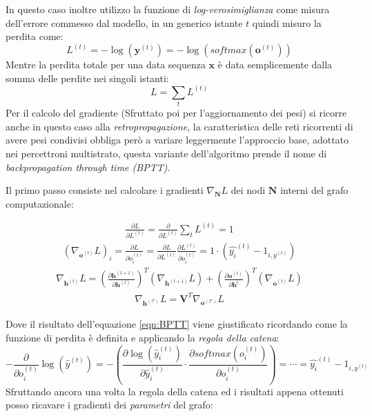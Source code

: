 \documentclass[../../main.tex]{subfiles}
\begin{document}
In questo caso inoltre utilizzo la funzione di \textit{log-verosimiglianza} come misura dell'errore commesso dal modello, in un generico istante $t$ quindi misuro la perdita come:
\[L^{(t)} = -\log(\boldsymbol{y}^{(t)}) = -\log(softmax(\boldsymbol{o}^{(t)}))\]
Mentre la perdita totale per una data sequenza $\boldsymbol{x}$ è data semplicemente dalla somma delle perdite nei singoli istanti:
\[L = \sum_t L^{(t)}\]
Per il calcolo del gradiente (Sfruttato poi per l'aggiornamento dei pesi) si ricorre anche in questo caso alla \textit{retropropagazione}, la caratteristica delle reti ricorrenti di avere pesi condivisi obbliga però a variare leggermente l'approccio base, adottato nei percettroni multistrato, questa variante dell'algoritmo prende il nome di \textit{backpropagation through time (BPTT)}.
 
Il primo passo consiste nel calcolare i gradienti $\nabla_{\boldsymbol{N}}L$ dei nodi $\boldsymbol{N}$ interni del grafo computazionale:
\begin{fleqn}[1cm]
    \begin{align}
        \frac{\partial L}{\partial L ^ {(t)}} = \frac{\partial}{\partial L ^{(t)}} \sum_t L^{(t)} = 1
    \end{align}
    \begin{align}
        (\nabla_{\boldsymbol{o}^{(t)}}L)_i = \frac{\partial L}{\partial o^{(t)}_i} = \frac{\partial L}{\partial L^{(t)}} \frac{\partial L^{(t)}}{\partial o^{(t)}_i} = 1 \cdot (\hat{y_i}^{(t)} - 1_{i,y^{(t)}})
        \label{eqn:BPTT}
    \end{align}
    \begin{align}
        \nabla_{\boldsymbol{h}^{(t)}}L = \left(\frac{\partial \boldsymbol{h}^{(t+1)}}{\partial \boldsymbol{h}^{(t)}}\right)^T (\nabla_{\boldsymbol{h}^{(t+1)}}L) + \left(\frac{\partial \boldsymbol{o}^{(t)}}{\partial \boldsymbol{h}^{t}}\right)^T (\nabla_{\boldsymbol{o}^{(t)}}L)
    \end{align}
    \begin{align}
        \nabla_{\boldsymbol{h}^{(\mathcal{T})}}L = \boldsymbol{V}^T \nabla_{\boldsymbol{o}^{(\mathcal{T})}} L 
    \end{align}
\end{fleqn}
Dove il risultato dell'equazione \ref{eqn:BPTT} viene giustificato ricordando come la funzione di perdita è definita e applicando la \textit{regola della catena}:
\[- \frac{\partial}{\partial o_i^{(t)}} \log(\hat{y}^{(t)}) = - \left(\frac{\partial \log(\hat{y}_i^{(t)})}{\partial \hat{y}_i^{(t)}} \cdot\frac{\partial softmax(o_i^{(t)})}{\partial o_i^{(t)}}\right) = \cdots = \hat{y_i}^{(t)} - 1_{i,y^{(t)}}\]
Sfruttando ancora una volta la regola della catena ed i risultati appena ottenuti posso ricavare i gradienti dei \textit{parametri} del grafo:
\end{document}
